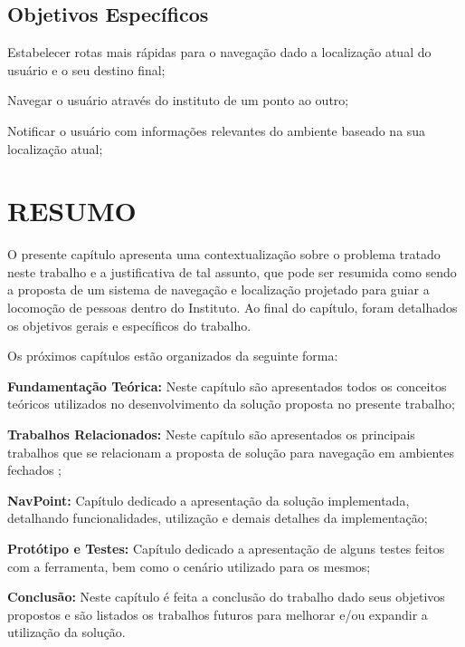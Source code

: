 \subsection{Objetivos Específicos}
\begin{lista}
  \item Estabelecer rotas mais rápidas para o navegação dado a localização atual do usuário e o seu destino final;
  \item Navegar o usuário através do instituto de um ponto ao outro;
  \item Notificar o usuário com informações relevantes do ambiente baseado na sua localização atual;
\end{lista}

\section*{RESUMO}
O presente capítulo apresenta uma contextualização sobre o problema tratado neste
trabalho e a justificativa de tal assunto, que pode ser resumida como sendo a proposta de um sistema de navegação e localização projetado para guiar a locomoção de pessoas dentro do Instituto.  Ao final do
capítulo, foram detalhados os objetivos gerais e específicos do trabalho.

Os próximos capítulos estão organizados da seguinte forma:

\begin{lista}
  \item \textbf{Fundamentação Teórica:} Neste capítulo são apresentados todos os conceitos teóricos utilizados no desenvolvimento da solução proposta no presente trabalho;
 \item \textbf{Trabalhos Relacionados:} Neste capítulo são apresentados os principais trabalhos que se relacionam a proposta de solução para navegação em ambientes fechados ;
  \item \textbf{NavPoint:} Capítulo dedicado a apresentação da solução implementada, detalhando funcionalidades, utilização e demais detalhes da implementação;
 \item \textbf{Protótipo e Testes:} Capítulo dedicado a apresentação de alguns testes feitos com a ferramenta, bem como o cenário utilizado para os mesmos;
  \item \textbf{Conclusão:} Neste capítulo é feita a conclusão do trabalho dado seus objetivos propostos e são listados os trabalhos futuros para melhorar e/ou expandir a utilização da solução.
\end{lista}


